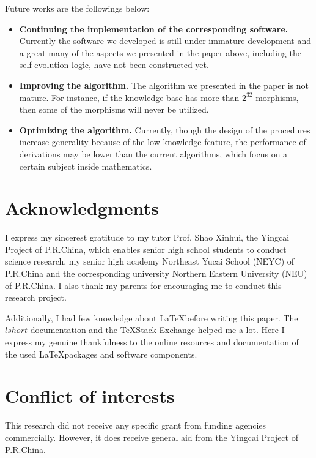 \documentclass{aims}
\numberwithin{equation}{section}
\numberwithin{theorem}{section}	%
\numberwithin{axiom}{section}	%
\numberwithin{definition}{section}	%
\begin{document}
	Future works are the followings below:
	\begin{itemize}
		\item \textbf{Continuing the implementation of the corresponding software.} Currently the software we developed is still under immature development and a great many of the aspects we presented in the paper above, including the self-evolution logic, have not been constructed yet.
		\item  \textbf{Improving the algorithm.} The algorithm we presented in the paper is not mature. For instance, if the knowledge base has more than \(2^{32}\) morphisms, then some of the morphisms will never be utilized.
		\item \textbf{Optimizing the algorithm.} Currently, though the design of the procedures increase generality because of the low-knowledge feature, the performance of derivations may be lower than the current algorithms, which focus on a certain subject inside mathematics.
	\end{itemize}
	
	\section{Acknowledgments}
	I express my sincerest gratitude to my tutor Prof. Shao Xinhui, the Yingcai Project of P.R.China, which enables senior high school students to conduct science research, my senior high academy Northeast Yucai School (NEYC) of P.R.China and the corresponding university Northern Eastern University (NEU) of P.R.China. I also thank my parents for encouraging me to conduct this research project.
	
	Additionally, I had few knowledge about \LaTeX before writing this paper. The $lshort$ documentation and the \TeX Stack Exchange helped me a lot. Here I express my genuine thankfulness to the online resources and documentation of the used \LaTeX packages and software components. 
	
	\section*{Conflict of interests}
	This research did not receive any specific grant from funding agencies commercially. However, it does receive general aid from the Yingcai Project of P.R.China.
	
%	
	
	
\end{document}
